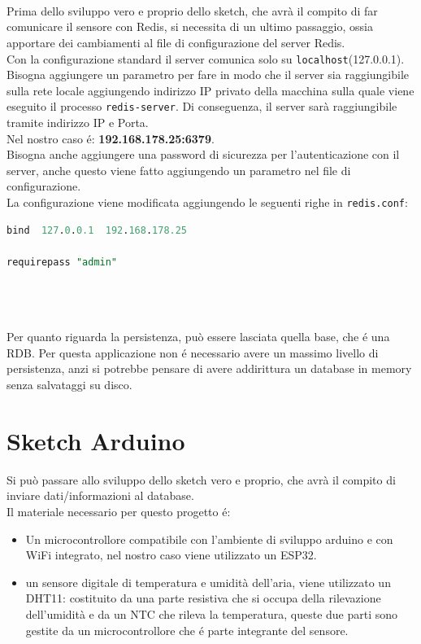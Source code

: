 \\
\\
\\
Prima dello sviluppo vero e proprio dello sketch, che avrà il compito di far comunicare il sensore con Redis,
si necessita di un ultimo passaggio, ossia apportare dei cambiamenti al file di configurazione del server Redis.
\\
Con la configurazione standard il server comunica solo su \texttt{localhost}(127.0.0.1).
Bisogna aggiungere un parametro per fare in modo che il server sia raggiungibile sulla rete locale aggiungendo indirizzo IP
privato della macchina sulla quale viene eseguito il processo \texttt{redis-server}.
Di conseguenza, il server sarà raggiungibile tramite indirizzo IP e Porta.\\
Nel nostro caso é: \textbf{192.168.178.25:6379}.\\
Bisogna anche aggiungere una password di sicurezza per l'autenticazione con il server, anche questo viene fatto
aggiungendo un parametro nel file di configurazione.
\\
La configurazione viene modificata aggiungendo le seguenti righe in \texttt{redis.conf}:
\begin{lstlisting}[autogobble, style=redis-cli, language=SQL]
bind  127.0.0.1  192.168.178.25

requirepass "admin"\end{lstlisting}
\\
\\
\\
Per quanto riguarda la persistenza, può essere lasciata quella base, che é una RDB.
Per questa applicazione non é necessario avere un massimo livello di persistenza, anzi si potrebbe pensare
di avere addirittura un database in memory senza salvataggi su disco.

\section{Sketch Arduino}
Si può passare allo sviluppo dello sketch vero e proprio, che avrà il compito
di inviare dati/informazioni al database.\\
Il materiale necessario per questo progetto é:
\begin{itemize}
    \item Un microcontrollore compatibile con l'ambiente di sviluppo arduino e con WiFi integrato,
          nel nostro caso viene utilizzato un ESP32.
    \item un sensore digitale di temperatura e umidità dell'aria, viene utilizzato un DHT11: costituito da una parte resistiva
    che si occupa della rilevazione dell'umidità e da un NTC che rileva la temperatura, queste due parti sono gestite
    da un microcontrollore che é parte integrante del sensore.
\end{itemize}

